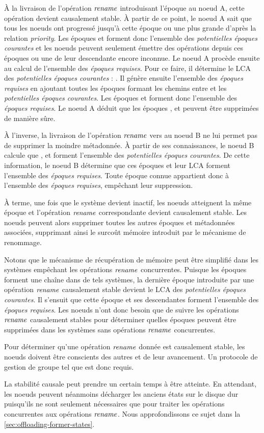 À la livraison de l'opération $\mathit{rename}$ introduisant l'époque  au noeud A, cette opération devient causalement stable.
À partir de ce point, le noeud A sait que tous les noeuds ont progressé jusqu'à cette époque ou une plus grande d'après la relation \emph{priority}.
Les époques  et  forment donc l'ensemble des \emph{potentielles époques courantes} et les noeuds peuvent seulement émettre des opérations depuis ces époques ou une de leur descendante encore inconnue.
Le noeud A procède ensuite au calcul de l'ensemble des \emph{époques requises}.
Pour ce faire, il détermine le \ac{LCA} des \emph{potentielles époques courantes} : .
Il génère ensuite l'ensemble des \emph{époques requises} en ajoutant toutes les époques formant les chemins entre  et les \emph{potentielles époques courantes}.
Les époques  et  forment donc l'ensemble des \emph{époques requises}.
Le noeud A déduit que les époques ,  et  peuvent être supprimées de manière sûre.

À l'inverse, la livraison de l'opération $\mathit{rename}$ vers  au noeud B ne lui permet pas de supprimer la moindre métadonnée.
À partir de ses connaissances, le noeud B calcule que ,  et  forment l'ensemble des \emph{potentielles époques courantes}.
De cette information, le noeud B détermine que ces époques et leur \ac{LCA} forment l'ensemble des \emph{époques requises}.
Toute époque connue appartient donc à l'ensemble des \emph{époques requises}, empêchant leur suppression.

À terme, une fois que le système devient inactif, les noeuds atteignent la même époque et l'opération $\mathit{rename}$ correspondante devient causalement stable.
Les noeuds peuvent alors supprimer toutes les autres époques et métadonnées associées, supprimant ainsi le surcoût mémoire introduit par le mécanisme de renommage.

Notons que le mécanisme de récupération de mémoire peut être simplifié dans les systèmes empêchant les opérations $\mathit{rename}$ concurrentes.
Puisque les époques forment une chaîne dans de tels systèmes, la dernière époque introduite par une opération $\mathit{rename}$ causalement stable devient le \ac{LCA} des \emph{potentielles époques courantes}.
Il s'ensuit que cette époque et ses descendantes forment l'ensemble des \emph{époques requises}.
Les noeuds n'ont donc besoin que de suivre les opérations $\mathit{rename}$ causalement stables pour déterminer quelles époques peuvent être supprimées dans les systèmes sans opérations $\mathit{rename}$ concurrentes.

Pour déterminer qu'une opération $\mathit{rename}$ donnée est causalement stable, les noeuds doivent être conscients des autres et de leur avancement.
Un protocole de gestion de groupe tel que \cite{swim2002,lifeguard2018} est donc requis.

La stabilité causale peut prendre un certain temps à être atteinte.
En attendant, les noeuds peuvent néanmoins décharger les anciens états sur le disque dur puisqu'ils ne sont seulement nécessaires que pour traiter les opérations concurrentes aux opérations $\mathit{rename}$.
Nous approfondissons ce sujet dans la \autoref{sec:offloading-former-states}.
